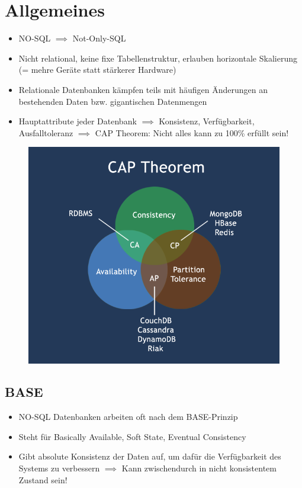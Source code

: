 \section{Allgemeines}
\begin{itemize}
    \item NO-SQL $\implies$ Not-Only-SQL
    \item Nicht relational, keine fixe Tabellenstruktur, erlauben horizontale Skalierung (= mehre Geräte statt stärkerer Hardware)
    \item Relationale Datenbanken kämpfen teils mit häufigen Änderungen an bestehenden Daten bzw. gigantischen Datenmengen
    \item Hauptattribute jeder Datenbank $\implies$ Konsistenz, Verfügbarkeit, Ausfalltoleranz $\implies$ CAP Theorem: Nicht alles kann zu 100\% erfüllt sein!
\end{itemize}
\begin{figure}[H]
    \centering
    \includegraphics[scale=.4]{res/themenkorb_8/cap_theorem.png}
\end{figure}

\subsection{BASE}
\begin{itemize}
    \item NO-SQL Datenbanken arbeiten oft nach dem BASE-Prinzip
    \item Steht für Basically Available, Soft State, Eventual Consistency
    \item Gibt absolute Konsistenz der Daten auf, um dafür die Verfügbarkeit des Systems zu verbessern $\implies$ Kann zwischendurch in nicht konsistentem Zustand sein!
\end{itemize}

